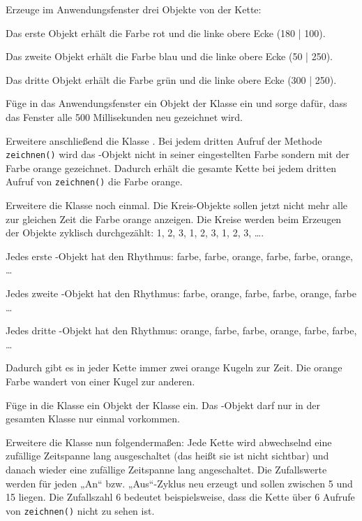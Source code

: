\begin{compactenum}[a)]
Erzeuge im Anwendungsfenster drei Objekte von der Kette:
\begin{compactitem}
\item Das erste Objekt erhält die Farbe rot und die linke obere Ecke (180 | 100).
\item Das zweite Objekt erhält die Farbe blau und die linke obere Ecke (50 | 250).
\item Das dritte Objekt erhält die Farbe grün und die linke obere Ecke (300 | 250).
\end{compactitem}

\item Füge in das Anwendungsfenster ein Objekt der Klasse  ein
und sorge dafür, dass das Fenster alle 500 Millisekunden neu gezeichnet wird.

Erweitere anschließend die Klasse . Bei jedem dritten Aufruf der
Methode \verb|zeichnen()| wird das -Objekt nicht in seiner
eingestellten Farbe sondern mit der Farbe orange gezeichnet. Dadurch erhält die
gesamte Kette bei jedem dritten Aufruf von \verb|zeichnen()| die Farbe orange.

\item Erweitere die Klasse  noch einmal. Die Kreis-Objekte sollen
jetzt nicht mehr alle zur gleichen Zeit die Farbe orange anzeigen. Die Kreise
werden beim Erzeugen der Objekte zyklisch durchgezählt: 1, 2, 3, 1, 2, 3, 1, 2,
3, \ldots .

Jedes erste -Objekt hat den Rhythmus: farbe, farbe, orange,
farbe, farbe, orange, \ldots

Jedes zweite -Objekt hat den Rhythmus: farbe, orange, farbe,
farbe, orange, farbe \ldots

Jedes dritte -Objekt hat den Rhythmus: orange, farbe, farbe,
orange, farbe, farbe, \ldots

Dadurch gibt es in jeder Kette immer zwei orange Kugeln zur Zeit. Die
orange Farbe wandert von einer Kugel zur anderen.

\item Füge in die Klasse  ein Objekt der Klasse 
ein. Das -Objekt darf nur in der gesamten Klasse 
nur einmal vorkommen.

Erweitere die Klasse  nun folgendermaßen: Jede Kette wird
abwechselnd eine zufällige Zeitspanne lang ausgeschaltet (das heißt sie ist
nicht sichtbar) und danach wieder eine zufällige Zeitspanne lang angeschaltet.
Die Zufallswerte werden für jeden „An“ bzw. „Aus“-Zyklus neu erzeugt und sollen
zwischen 5 und 15 liegen. Die Zufallszahl 6 bedeutet beispielsweise, dass die
Kette über 6 Aufrufe von \verb|zeichnen()| nicht zu sehen ist.

\end{compactenum}



